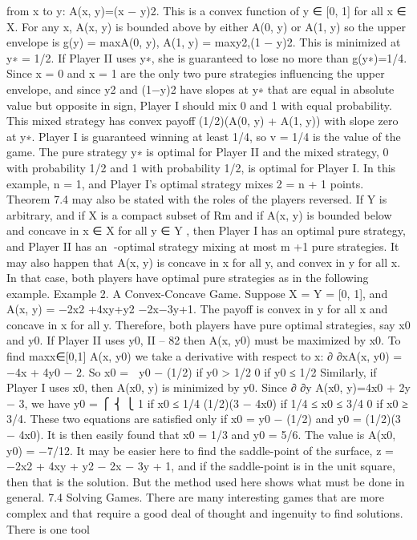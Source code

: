 from x to y: A(x, y)=(x − y)2. This is a convex function of y ∈ [0, 1] for all x ∈ X.
For any x, A(x, y) is bounded above by either A(0, y) or A(1, y) so the upper envelope
is g(y) = max{A(0, y), A(1, y)} = max{y2,(1 − y)2}. This is minimized at y∗ = 1/2. If
Player II uses y∗, she is guaranteed to lose no more than g(y∗)=1/4.
Since x = 0 and x = 1 are the only two pure strategies influencing the upper envelope,
and since y2 and (1−y)2 have slopes at y∗ that are equal in absolute value but opposite in
sign, Player I should mix 0 and 1 with equal probability. This mixed strategy has convex
payoff (1/2)(A(0, y) + A(1, y)) with slope zero at y∗. Player I is guaranteed winning at
least 1/4, so v = 1/4 is the value of the game. The pure strategy y∗ is optimal for Player
II and the mixed strategy, 0 with probability 1/2 and 1 with probability 1/2, is optimal for
Player I. In this example, n = 1, and Player I’s optimal strategy mixes 2 = n + 1 points.
Theorem 7.4 may also be stated with the roles of the players reversed. If Y is arbitrary,
and if X is a compact subset of Rm and if A(x, y) is bounded below and concave in x ∈ X
for all y ∈ Y , then Player I has an optimal pure strategy, and Player II has an -optimal
strategy mixing at most m +1 pure strategies. It may also happen that A(x, y) is concave
in x for all y, and convex in y for all x. In that case, both players have optimal pure
strategies as in the following example.
Example 2. A Convex-Concave Game. Suppose X = Y = [0, 1], and A(x, y) =
−2x2 +4xy+y2 −2x−3y+1. The payoff is convex in y for all x and concave in x for all y.
Therefore, both players have pure optimal strategies, say x0 and y0. If Player II uses y0,
II – 82
then A(x, y0) must be maximized by x0. To find maxx∈[0,1] A(x, y0) we take a derivative
with respect to x: ∂
∂xA(x, y0) = −4x + 4y0 − 2. So
x0 =
 y0 − (1/2) if y0 > 1/2
0 if y0 ≤ 1/2
Similarly, if Player I uses x0, then A(x0, y) is minimized by y0. Since ∂
∂y A(x0, y)=4x0 +
2y − 3, we have
y0 =
⎧
⎨
⎩
1 if x0 ≤ 1/4
(1/2)(3 − 4x0) if 1/4 ≤ x0 ≤ 3/4
0 if x0 ≥ 3/4.
These two equations are satisfied only if x0 = y0 − (1/2) and y0 = (1/2)(3 − 4x0). It is
then easily found that x0 = 1/3 and y0 = 5/6. The value is A(x0, y0) = −7/12.
It may be easier here to find the saddle-point of the surface, z = −2x2 + 4xy + y2 −
2x − 3y + 1, and if the saddle-point is in the unit square, then that is the solution. But
the method used here shows what must be done in general.
7.4 Solving Games. There are many interesting games that are more complex and
that require a good deal of thought and ingenuity to find solutions. There is one tool
